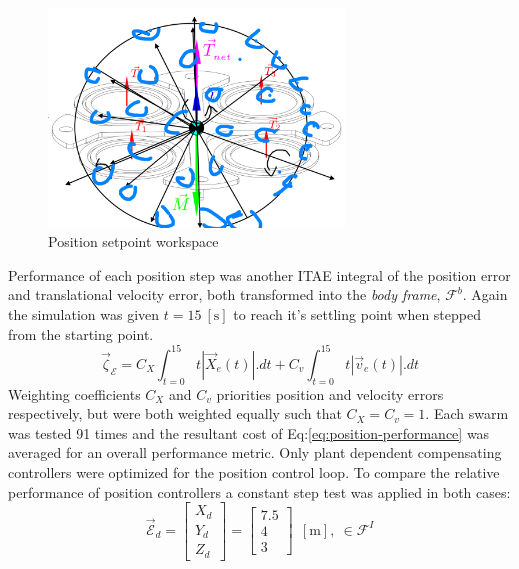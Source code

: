 \begin{figure}[htbp]
\centering
\includegraphics[width=0.7\textwidth]{figs/position-setpoint}
\caption{Position setpoint workspace}
\label{fig:position-setpoint}
\end{figure}
\par
Performance of each position step was another ITAE integral of the position error and translational velocity error, both transformed into the \emph{body frame}, $\mathcal{F}^{b}$. Again the simulation was given $t=15~[\text{s}]$ to reach it's settling point when stepped from the starting point.
\begin{equation}\label{eq:position-performance}
\vec{\zeta}_{\mathcal{E}}=C_{X}\int_{t=0}^{15}t|\vec{X}_e(t)|.dt+C_{v}\int_{t=0}^{15}t|\vec{v}_e(t)|.dt
\end{equation}
Weighting coefficients $C_X$ and $C_v$ priorities position and velocity errors respectively, but were both weighted equally such that $C_X=C_v=1$. Each swarm was tested 91 times and the resultant cost of Eq:\ref{eq:position-performance} was averaged for an overall performance metric. Only plant dependent compensating controllers were optimized for the position control loop. To compare the relative performance of position controllers a constant step test was applied in both cases:
\begin{equation}
\vec{\mathcal{E}}_d=\begin{bmatrix}
X_d\\
Y_d\\
Z_d
\end{bmatrix}=\begin{bmatrix}
7.5\\
4\\
3
\end{bmatrix}~~[\text{m}],~\in\mathcal{F}^{I}
\end{equation}
